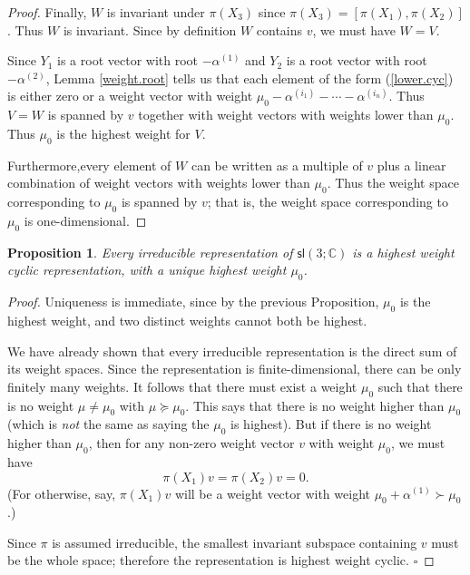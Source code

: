 \documentclass{amsbook}
\theoremstyle{plain}
\newtheorem{proposition}[theorem]{Proposition}
\numberwithin{equation}{chapter}
\numberwithin{theorem}{chapter}
\begin{document}
\begin{proof}
Finally, $W$ is invariant under $\pi(X_{3})$ since $\pi(X_{3})=\left[
\pi(X_{1}),\pi(X_{2})\right]  $. Thus $W$ is invariant. Since by definition
$W$ contains $v$, we must have $W=V$.

Since $Y_{1}$ is a root vector with root $-\alpha^{(1)}$ and $Y_{2}$ is a root
vector with root $-\alpha^{(2)}$, Lemma \ref{weight.root} tells us that each
element of the form (\ref{lower.cyc}) is either zero or a weight vector with
weight $\mu_{0}-\alpha^{(i_{1})}-\cdots-\alpha^{(i_{n})}$. Thus $V=W$ is
spanned by $v$ together with weight vectors with weights lower than $\mu_{0}$.
Thus $\mu_{0}$ is the highest weight for $V$.

Furthermore,every element of $W$ can be written as a multiple of $v$ plus a
linear combination of weight vectors with weights lower than $\mu_{0}$. Thus
the weight space corresponding to $\mu_{0}$ is spanned by $v$; that is, the
weight space corresponding to $\mu_{0}$ is one-dimensional.
\end{proof}

\begin{proposition}
Every irreducible representation of $\mathsf{sl}\left(  3;\mathbb{C}\right)  $
is a highest weight cyclic representation, with a unique highest weight
$\mu_{0}$.
\end{proposition}

\begin{proof}
Uniqueness is immediate, since by the previous Proposition, $\mu_{0}$ is the
highest weight, and two distinct weights cannot both be highest.

We have already shown that every irreducible representation is the direct sum
of its weight spaces. Since the representation is finite-dimensional, there
can be only finitely many weights. It follows that there must exist a weight
$\mu_{0}$ such that there is no weight $\mu\neq\mu_{0}$ with $\mu\succeq
\mu_{0}$. This says that there is no weight higher than $\mu_{0}$ (which is
\textit{not} the same as saying the $\mu_{0}$ is highest). But if there is no
weight higher than $\mu_{0}$, then for any non-zero weight vector $v$ with
weight $\mu_{0}$, we must have
\[
\pi(X_{1})v=\pi(X_{2})v=0\text{.}%
\]
(For otherwise, say, $\pi(X_{1})v$ will be a weight vector with weight
$\mu_{0}+\alpha^{(1)}\succ\mu_{0}$.)

Since $\pi$ is assumed irreducible, the smallest invariant subspace containing
$v$ must be the whole space; therefore the representation is highest weight
cyclic. $\square$
\end{proof}
\end{document}
